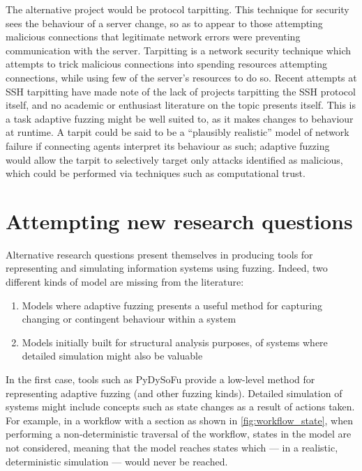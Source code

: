 \documentclass[11pt]{article}
\begin{document}
The alternative project would be protocol tarpitting. This technique for
security sees the behaviour of a server change, so as to appear to those
attempting malicious connections that legitimate network errors were preventing
communication with the server. Tarpitting is a network security technique which
attempts to trick malicious connections into spending resources attempting
connections, while using few of the server's resources to do so. Recent attempts
at SSH tarpitting\cite{endlessh} have made note of the lack of projects
tarpitting the SSH protocol itself, and no academic or enthusiast literature on
the topic presents itself. This is a task adaptive fuzzing might be well suited
to, as it makes changes to behaviour at runtime. A tarpit could be said to be a
``plausibly realistic'' model of network failure if connecting agents interpret
its behaviour as such; adaptive fuzzing would allow the tarpit to selectively
target only attacks identified as malicious, which could be performed via
techniques such as computational trust\cite{marsh_thesis}.


\section{Attempting new research questions}
\label{sec:org2b1b296}
\label{sec:new_questions}
Alternative research questions present themselves in producing tools for
representing and simulating information systems using fuzzing. Indeed, two
different kinds of model are missing from the literature:

\begin{enumerate}
\item Models where adaptive fuzzing presents a useful method for capturing changing
or contingent behaviour within a system
\item Models initially built for structural analysis purposes, of systems where
detailed simulation might also be valuable
\end{enumerate}

In the first case, tools such as PyDySoFu\cite{pdsf_repo} provide a low-level
method for representing adaptive fuzzing (and other fuzzing kinds). Detailed
simulation of systems might include concepts such as state changes as a result
of actions taken. For example, in a workflow with a section as shown in
\cref{fig:workflow_state}, when performing a non-deterministic traversal of the
workflow, states in the model are not considered, meaning that the model reaches
states which --- in a realistic, deterministic simulation --- would never be
reached. 
\end{document}
